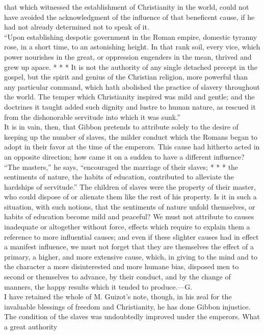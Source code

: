 {that which witnessed the establishment of Christianity in the
world, could not have avoided the acknowledgment of the influence
of that beneficent cause, if he had not already determined not to
speak of it.\\
“Upon establishing despotic government in the Roman empire,
domestic tyranny rose, in a short time, to an astonishing height.
In that rank soil, every vice, which power nourishes in the
great, or oppression engenders in the mean, thrived and grew up
apace. * * * It is not the authority of any single detached
precept in the gospel, but the spirit and genius of the Christian
religion, more powerful than any particular command, which hath
abolished the practice of slavery throughout the world. The
temper which Christianity inspired was mild and gentle; and the
doctrines it taught added such dignity and lustre to human
nature, as rescued it from the dishonorable servitude into which
it was sunk.”\\
It is in vain, then, that Gibbon pretends to attribute solely to
the desire of keeping up the number of slaves, the milder conduct
which the Romans began to adopt in their favor at the time of the
emperors. This cause had hitherto acted in an opposite direction;
how came it on a sudden to have a different influence? “The
masters,” he says, “encouraged the marriage of their slaves; * *
* the sentiments of nature, the habits of education, contributed
to alleviate the hardships of servitude.” The children of slaves
were the property of their master, who could dispose of or
alienate them like the rest of his property. Is it in such a
situation, with such notions, that the sentiments of nature
unfold themselves, or habits of education become mild and
peaceful? We must not attribute to causes inadequate or
altogether without force, effects which require to explain them a
reference to more influential causes; and even if these slighter
causes had in effect a manifest influence, we must not forget
that they are themselves the effect of a primary, a higher, and
more extensive cause, which, in giving to the mind and to the
character a more disinterested and more humane bias, disposed men
to second or themselves to advance, by their conduct, and by the
change of manners, the happy results which it tended to
produce.—G.\\
I have retained the whole of M. Guizot’s note, though, in his
zeal for the invaluable blessings of freedom and Christianity, he
has done Gibbon injustice. The condition of the slaves was
undoubtedly improved under the emperors. What a great authority
}
